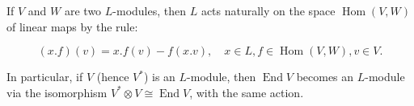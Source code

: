 If $V$ and $W$ are two $L$-modules, then $L$ acts naturally on the space $\operatorname{Hom}(V, W)$ of linear maps by the rule:

$$(x.f)(v) = x.f(v) - f(x.v), \quad x \in L, f \in \operatorname{Hom}(V, W), v \in V.$$

In particular, if $V$ (hence $V^*$) is an $L$-module, then $\operatorname{End} V$ becomes an $L$-module via the isomorphism $V^* \otimes V \cong \operatorname{End} V$, with the same action.
